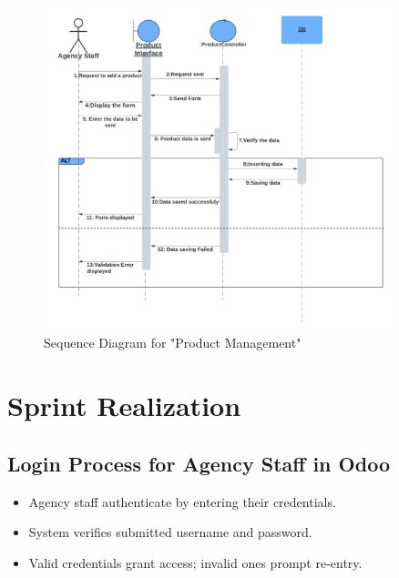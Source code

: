 \begin{figure}[h]
    \centering
    \includegraphics[width=0.9\textwidth]{sprint1/Sprint1Sequence.png}
    \caption{Sequence Diagram for "Product Management"}
    \label{fig:product_management_sequence_diagram}
\end{figure}
\newpage
\section{Sprint Realization}

\subsection{Login Process for Agency Staff in Odoo}
\begin{itemize}
    \item Agency staff authenticate by entering their credentials.
    \item System verifies submitted username and password.
    \item Valid credentials grant access; invalid ones prompt re-entry.
\end{itemize}

